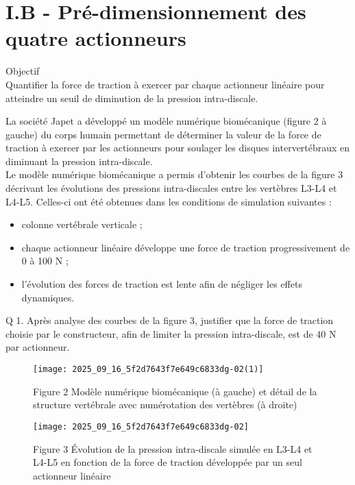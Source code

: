 \section{I.B - Pré-dimensionnement des quatre actionneurs}
\begin{displayquote}
Objectif\\
Quantifier la force de traction à exercer par chaque actionneur linéaire pour atteindre un seuil de diminution de la pression intra-discale.
\end{displayquote}

La société Japet a développé un modèle numérique biomécanique (figure 2 à gauche) du corps humain permettant de déterminer la valeur de la force de traction à exercer par les actionneurs pour soulager les disques intervertébraux en diminuant la pression intra-discale.\\
Le modèle numérique biomécanique a permis d'obtenir les courbes de la figure 3 décrivant les évolutions des pressions intra-discales entre les vertèbres L3-L4 et L4-L5. Celles-ci ont été obtenues dans les conditions de simulation suivantes :

\begin{itemize}
  \item colonne vertébrale verticale ;
  \item chaque actionneur linéaire développe une force de traction progressivement de 0 à 100 N ;
  \item l'évolution des forces de traction est lente afin de négliger les effets dynamiques.
\end{itemize}

Q 1. Après analyse des courbes de la figure 3, justifier que la force de traction choisie par le constructeur, afin de limiter la pression intra-discale, est de 40 N par actionneur.

\begin{figure}[h]
\begin{center}
  \texttt{[image: 2025\_09\_16\_5f2d7643f7e649c6833dg-02(1)]}
\captionsetup{labelformat=empty}
\caption{Figure 2 Modèle numérique biomécanique (à gauche) et détail de la structure vertébrale avec numérotation des vertèbres (à droite)}
\end{center}
\end{figure}

\begin{figure}[h]
\begin{center}
  \texttt{[image: 2025\_09\_16\_5f2d7643f7e649c6833dg-02]}
\captionsetup{labelformat=empty}
\caption{Figure 3 Évolution de la pression intra-discale simulée en L3-L4 et L4-L5 en fonction de la force de traction développée par un seul actionneur linéaire}
\end{center}
\end{figure}

